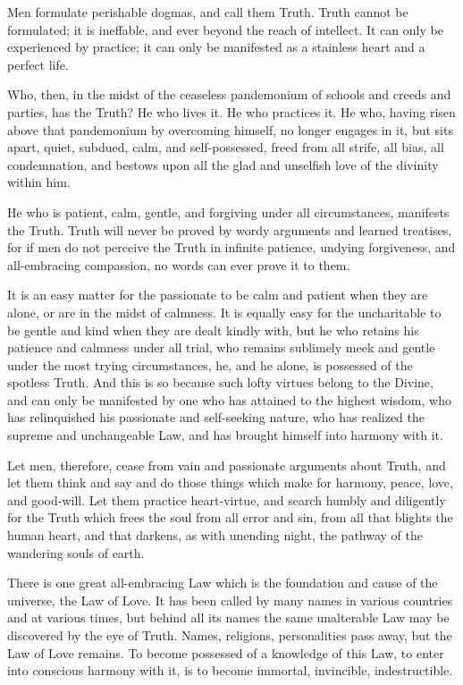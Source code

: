 \documentclass[12pt,oneside]{scrbook}
\begin{document}
  Men formulate perishable dogmas, and call them Truth. Truth cannot be
  formulated; it is ineffable, and ever beyond the reach of intellect. It
  can only be experienced by practice; it can only be manifested as a
  stainless heart and a perfect life.
  
  Who, then, in the midst of the ceaseless pandemonium of schools and
  creeds and parties, has the Truth? He who lives it. He who practices it.
  He who, having risen above that pandemonium by overcoming himself, no
  longer engages in it, but sits apart, quiet, subdued, calm, and
  self-possessed, freed from all strife, all bias, all condemnation, and
  bestows upon all the glad and unselfish love of the divinity within him.
  
  He who is patient, calm, gentle, and forgiving under all circumstances,
  manifests the Truth. Truth will never be proved by wordy arguments and
  learned treatises, for if men do not perceive the Truth in infinite
  patience, undying forgiveness, and all-embracing compassion, no words
  can ever prove it to them.
  
  It is an easy matter for the passionate to be calm and patient when they
  are alone, or are in the midst of calmness. It is equally easy for the
  uncharitable to be gentle and kind when they are dealt kindly with, but
  he who retains his patience and calmness under all trial, who remains
  sublimely meek and gentle under the most trying circumstances, he, and
  he alone, is possessed of the spotless Truth. And this is so because
  such lofty virtues belong to the Divine, and can only be manifested by
  one who has attained to the highest wisdom, who has relinquished his
  passionate and self-seeking nature, who has realized the supreme and
  unchangeable Law, and has brought himself into harmony with it.
  
  Let men, therefore, cease from vain and passionate arguments about
  Truth, and let them think and say and do those things which make for
  harmony, peace, love, and good-will. Let them practice heart-virtue, and
  search humbly and diligently for the Truth which frees the soul from all
  error and sin, from all that blights the human heart, and that darkens,
  as with unending night, the pathway of the wandering souls of earth.
  
  There is one great all-embracing Law which is the foundation and cause
  of the universe, the Law of Love. It has been called by many names in
  various countries and at various times, but behind all its names the
  same unalterable Law may be discovered by the eye of Truth. Names,
  religions, personalities pass away, but the Law of Love remains. To
  become possessed of a knowledge of this Law, to enter into conscious
  harmony with it, is to become immortal, invincible, indestructible.
  
\end{document}
